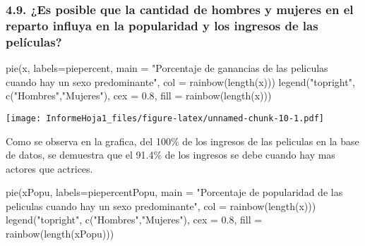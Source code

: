 \documentclass[
]{article}
\newenvironment{Shaded}{\begin{snugshade}}{\end{snugshade}}
\newcommand{\AttributeTok}[1]{\textcolor[rgb]{0.77,0.63,0.00}{#1}}
\newcommand{\FloatTok}[1]{\textcolor[rgb]{0.00,0.00,0.81}{#1}}
\newcommand{\FunctionTok}[1]{\textcolor[rgb]{0.00,0.00,0.00}{#1}}
\newcommand{\NormalTok}[1]{#1}
\newcommand{\StringTok}[1]{\textcolor[rgb]{0.31,0.60,0.02}{#1}}
\begin{document}
\hypertarget{es-posible-que-la-cantidad-de-hombres-y-mujeres-en-el-reparto-influya-en-la-popularidad-y-los-ingresos-de-las-peluxedculas}{%
\subsubsection{4.9. ¿Es posible que la cantidad de hombres y mujeres en
el reparto influya en la popularidad y los ingresos de las
películas?}\label{es-posible-que-la-cantidad-de-hombres-y-mujeres-en-el-reparto-influya-en-la-popularidad-y-los-ingresos-de-las-peluxedculas}}

\begin{Shaded}
\begin{Highlighting}[]
\FunctionTok{pie}\NormalTok{(x, }\AttributeTok{labels=}\NormalTok{piepercent, }\AttributeTok{main =} \StringTok{"Porcentaje de ganancias de las peliculas cuando hay un sexo predominante"}\NormalTok{, }\AttributeTok{col =} \FunctionTok{rainbow}\NormalTok{(}\FunctionTok{length}\NormalTok{(x)))}
                \FunctionTok{legend}\NormalTok{(}\StringTok{"topright"}\NormalTok{, }\FunctionTok{c}\NormalTok{(}\StringTok{"Hombres"}\NormalTok{,}\StringTok{"Mujeres"}\NormalTok{), }\AttributeTok{cex =} \FloatTok{0.8}\NormalTok{,}
                       \AttributeTok{fill =} \FunctionTok{rainbow}\NormalTok{(}\FunctionTok{length}\NormalTok{(x)))}
\end{Highlighting}
\end{Shaded}

\texttt{[image: InformeHoja1\_files/figure-latex/unnamed-chunk-10-1.pdf]}

Como se observa en la grafica, del 100\% de los ingresos de las
peliculas en la base de datos, se demuestra que el 91.4\% de los
ingresos se debe cuando hay mas actores que actrices.

\begin{Shaded}
\begin{Highlighting}[]
\FunctionTok{pie}\NormalTok{(xPopu, }\AttributeTok{labels=}\NormalTok{piepercentPopu, }\AttributeTok{main =} \StringTok{"Porcentaje de popularidad de las peliculas cuando hay un sexo predominante"}\NormalTok{, }\AttributeTok{col =} \FunctionTok{rainbow}\NormalTok{(}\FunctionTok{length}\NormalTok{(x)))}
\FunctionTok{legend}\NormalTok{(}\StringTok{"topright"}\NormalTok{, }\FunctionTok{c}\NormalTok{(}\StringTok{"Hombres"}\NormalTok{,}\StringTok{"Mujeres"}\NormalTok{), }\AttributeTok{cex =} \FloatTok{0.8}\NormalTok{,}
       \AttributeTok{fill =} \FunctionTok{rainbow}\NormalTok{(}\FunctionTok{length}\NormalTok{(xPopu)))}
\end{Highlighting}
\end{Shaded}
\end{document}
